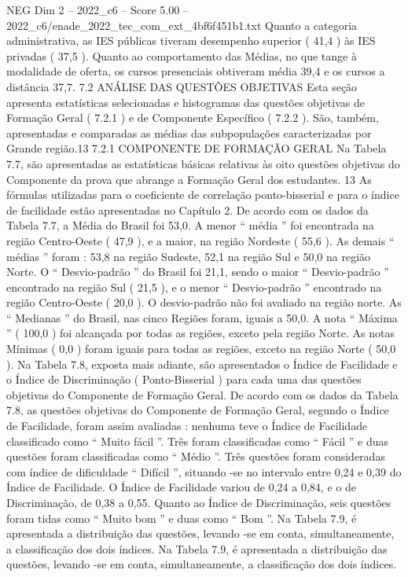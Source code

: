 \begin{textsample}{NEG Dim 2 – 2022\_c6 – Score 5.00 – 2022\_c6/enade\_2022\_tec\_com\_ext\_4bf6f451b1.txt}
Quanto a categoria administrativa, as IES públicas tiveram desempenho superior ( 41,4 ) às IES privadas ( 37,5 ).
Quanto ao comportamento das Médias, no que tange à modalidade de oferta, os cursos presenciais obtiveram média 39,4 e os cursos a distância 37,7. 7.2 ANÁLISE DAS QUESTÕES OBJETIVAS Esta seção apresenta estatísticas selecionadas e histogramas das questões objetivas de Formação Geral ( 7.2.1 ) e de Componente Específico ( 7.2.2 ).
São, também, apresentadas e comparadas as médias das subpopulações caracterizadas por Grande região.13 7.2.1 COMPONENTE DE FORMAÇÃO GERAL Na Tabela 7.7, são apresentadas as estatísticas básicas relativas às oito questões objetivas do Componente da prova que abrange a Formação Geral dos estudantes. 13 As fórmulas utilizadas para o coeficiente de correlação ponto-bisserial e para o índice de facilidade estão apresentadas no Capítulo 2.
De acordo com os dados da Tabela 7.7, a Média do Brasil foi 53,0.
A menor “ média ” foi encontrada na região Centro-Oeste ( 47,9 ), e a maior, na região Nordeste ( 55,6 ).
As demais “ médias ” foram : 53,8 na região Sudeste, 52,1 na região Sul e 50,0 na região Norte.
O “ Desvio-padrão ” do Brasil foi 21,1, sendo o maior “ Desvio-padrão ” encontrado na região Sul ( 21,5 ), e o menor “ Desvio-padrão ” encontrado na região Centro-Oeste ( 20,0 ).
O desvio-padrão não foi avaliado na região norte.
As “ Medianas ” do Brasil, nas cinco Regiões foram, iguais a 50,0.
A nota “ Máxima ” ( 100,0 ) foi alcançada por todas as regiões, exceto pela região Norte.
As notas Mínimas ( 0,0 ) foram iguais para todas as regiões, exceto na região Norte ( 50,0 ).
Na Tabela 7.8, exposta mais adiante, são apresentados o Índice de Facilidade e o Índice de Discriminação ( Ponto-Bisserial ) para cada uma das questões objetivas do Componente de Formação Geral.
De acordo com os dados da Tabela 7.8, as questões objetivas do Componente de Formação Geral, segundo o Índice de Facilidade, foram assim avaliadas : nenhuma teve o Índice de Facilidade classificado como “ Muito fácil ”.
Três foram classificadas como “ Fácil ” e duas questões foram classificadas como “ Médio ”.
Três questões foram consideradas com índice de dificuldade “ Difícil ”, situando -se no intervalo entre 0,24 e 0,39 do Índice de Facilidade.
O Índice de Facilidade variou de 0,24 a 0,84, e o de Discriminação, de 0,38 a 0,55.
Quanto ao Índice de Discriminação, seis questões foram tidas como “ Muito bom ” e duas como “ Bom ”.
Na Tabela 7.9, é apresentada a distribuição das questões, levando -se em conta, simultaneamente, a classificação dos dois índices.
Na Tabela 7.9, é apresentada a distribuição das questões, levando -se em conta, simultaneamente, a classificação dos dois índices.

\end{textsample}
